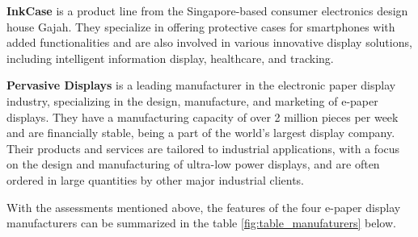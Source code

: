\documentclass[../Main.tex]{subfiles}
\begin{document}
\textbf{InkCase} is a product line from the Singapore-based consumer electronics design house Gajah. They specialize in offering protective cases for smartphones with added functionalities and are also involved in various innovative display solutions, including intelligent information display, healthcare, and tracking\cite{inkcase}. 

\textbf{Pervasive Displays} is a leading manufacturer in the electronic paper display industry, specializing in the design, manufacture, and marketing of e-paper displays. They have a manufacturing capacity of over 2 million pieces per week and are financially stable, being a part of the world's largest display company\cite{pvsdp}. Their products and services are tailored to industrial applications, with a focus on the design and manufacturing of ultra-low power displays, and are often ordered in large quantities by other major industrial clients.

With the assessments mentioned above, the features of the four e-paper display manufacturers can be summarized in the table \ref{fig:table_manufaturers} below.
\end{document}
